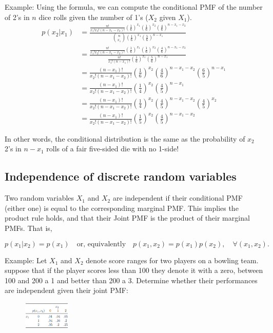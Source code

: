 \documentclass[]{book}
\begin{document}
 Example: Using the formula, we can compute the conditional PMF of the
number of 2's in \(n\) dice rolls given the number of 1's (\(X_2\) given
\(X_1\)).\\

\begin{align*}
p(x_2|x_1) &= \frac{\frac{n!}{x_1! x_2! (n-x_1 -x_2)!}(\tfrac16)^{x_1}(\tfrac16)^{x_2}(\tfrac46)^{n-x_1-x_2}}{{n \choose x_1}(\tfrac16)^{x_1}(\tfrac56)^{n-x_1}}\\
& = \frac{\frac{n!}{x_1! x_2! (n-x_1 -x_2)!}(\tfrac16)^{x_1}(\tfrac16)^{x_2}(\tfrac46)^{n-x_1-x_2}}{\frac{n!}{x_1!(n-x_1)!}(\tfrac16)^{x_1}(\tfrac56)^{n-x_1}}\\
& = \frac{(n-x_1)!}{x_2!(n-x_1-x_2)!}(\tfrac16)^{x_2}(\tfrac46)^{n-x_1-x_2}(\tfrac65)^{n-x_1}\\
&=\frac{(n-x_1)!}{x_2!(n-x_1-x_2)!}(\tfrac14)^{x_2}(\tfrac45)^{n-x_1}\\
& = \frac{(n-x_1)!}{x_2!(n-x_1-x_2)!}(\tfrac14)^{x_2}(\tfrac45)^{n-x_1-x_2}(\tfrac{4}{5})^{x_2}\\
& = \frac{(n-x_1)!}{x_2!(n-x_1-x_2)!}(\tfrac15)^{x_2}(\tfrac45)^{n-x_1-x_2}
\end{align*}

In other words, the conditional distribution is the same as the
probability of \(x_2\) 2's in \(n-x_1\) rolls of a fair five-sided die
with no 1-side!

\subsection{Independence of discrete random
variables}\label{independence-of-discrete-random-variables}

Two random variables \(X_1\) and \(X_2\) are independent if their
conditional PMF (either one) is equal to the corresponding marginal PMF.
This implies the product rule holds, and that their Joint PMF is the
product of their marginal PMFs. That is,

\[p(x_1|x_2) = p(x_1)\quad\text{or, equivalently}\quad p(x_1,x_2)=p(x_1)p(x_2), \quad \forall (x_1,x_2).\]

Example: Let \(X_1\) and \(X_2\) denote score ranges for two players on
a bowling team. suppose that if the player scores less than 100 they
denote it with a zero, between 100 and 200 a 1 and better than 200 a 3.
Determine whether their performances are independent given their joint
PMF:

\begin{figure}[htbp]
\centering
\includegraphics[width=0.20000\textwidth]{joint_pmf_ind.PNG}
\caption{}
\end{figure}
\end{document}
